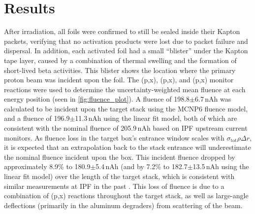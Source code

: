 % 




\section{Results}


After irradiation, all foils were confirmed to still be sealed inside their Kapton packets, verifying that no activation products were lost due to packet failure and dispersal.
In addition, each activated foil had a small \enquote{blister} under the Kapton tape layer, caused by a combination of thermal swelling and the formation of short-lived beta activities.
This blister   shows the location where the primary proton beam was incident upon the foil.
The (p,x), (p,x), and (p,x) monitor reactions were used to determine the uncertainty-weighted mean fluence at each energy position (seen in \autoref{fig:fluence_plot}).
A fluence of 198.8$\pm$6.7\,nAh was calculated to be incident upon the target stack using the MCNP6 fluence model, and a  fluence of 196.9$\pm$11.3\,nAh using the linear fit model, both of which are consistent with the nominal fluence of 205.9\,nAh based on IPF upstream current monitors.
As fluence loss in the target box's entrance window scales with $\sigma_{\mathrm{tot}}\rho\Delta r$, it is expected that an extrapolation back to the stack entrance will underestimate the nominal fluence incident upon the box.
This incident fluence dropped by approximately 8.9\% to  180.9$\pm$5.4\,nAh (and by 7.2\% to  182.7$\pm$13.5\,nAh using the linear fit model) over the length of the target stack, which is consistent with similar measurements at IPF in the past \cite{Graves2016}.
This loss of fluence is due to a combination of 
(p,x) reactions throughout the target stack, as well as large-angle deflections (primarily in the aluminum degraders) from scattering of the beam.





